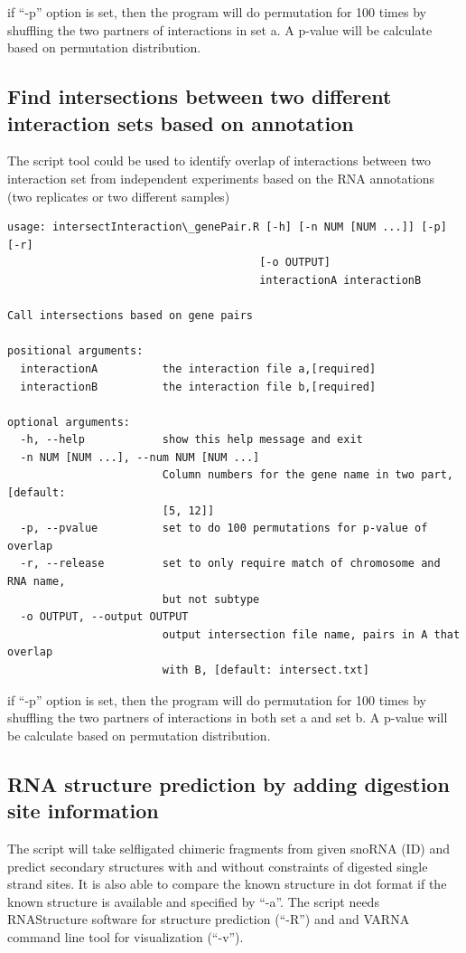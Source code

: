 \documentclass[letterpaper,10pt,english]{sphinxmanual}
\begin{document}
if ``-p'' option is set, then the program will do permutation for 100 times by shuffling the two partners of interactions in set a. A p-value will be calculate based on permutation distribution.


\subsection{Find intersections between two different interaction sets based on annotation}
\label{Analysis_pipeline:intersectiongene}\label{Analysis_pipeline:find-intersections-between-two-different-interaction-sets-based-on-annotation}
The script tool  could be used to identify overlap of interactions between two interaction set from independent experiments based on the RNA annotations (two replicates or two different samples)

\begin{Verbatim}[commandchars=\\\{\}]
usage: intersectInteraction\_genePair.R [-h] [-n NUM [NUM ...]] [-p] [-r]
                                       [-o OUTPUT]
                                       interactionA interactionB

Call intersections based on gene pairs

positional arguments:
  interactionA          the interaction file a,[required]
  interactionB          the interaction file b,[required]

optional arguments:
  -h, --help            show this help message and exit
  -n NUM [NUM ...], --num NUM [NUM ...]
                        Column numbers for the gene name in two part,[default:
                        [5, 12]]
  -p, --pvalue          set to do 100 permutations for p-value of overlap
  -r, --release         set to only require match of chromosome and RNA name,
                        but not subtype
  -o OUTPUT, --output OUTPUT
                        output intersection file name, pairs in A that overlap
                        with B, [default: intersect.txt]
\end{Verbatim}

if ``-p'' option is set, then the program will do permutation for 100 times by shuffling the two partners of interactions in both set a and set b. A p-value will be calculate based on permutation distribution.


\subsection{RNA structure prediction by adding digestion site information}
\label{Analysis_pipeline:rna-structure-prediction-by-adding-digestion-site-information}\label{Analysis_pipeline:structure}
The script will take selfligated chimeric fragments from given snoRNA (ID) and predict secondary structures with and without constraints of digested single strand sites. It is also able to compare the known structure in dot format if the known structure is available and specified by ``-a''. The script needs RNAStructure software for structure prediction (``-R'') and  and VARNA command line tool for visualization (``-v'').
\end{document}
